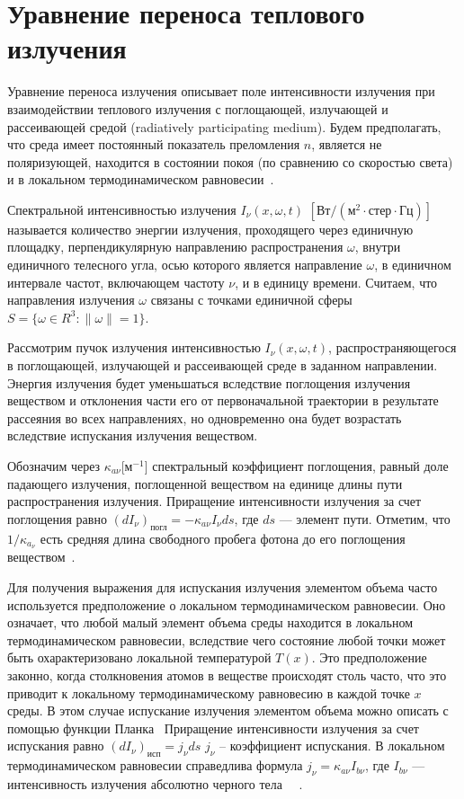 \section{Уравнение переноса теплового излучения}\label{sec:ch1/sec1}
Уравнение переноса излучения описывает поле интенсивности излучения
при взаимодействии теплового излучения с поглощающей,
излучающей и рассеивающей средой
(radiatively participating medium).
Будем предполагать, что среда имеет постоянный показатель
преломления $n$, является не поляризующей,
находится в состоянии покоя (по сравнению со скоростью света) и в локальном
термодинамическом равновесии~\cite[280]{modest2013radiative}.


Спектральной интенсивностью излучения $I_\nu (x, \omega, t)$
$[\text{Вт}/(\text{м}^2 \cdot \text{стер} \cdot \text{Гц})]$
называется количество энергии излучения, проходящего через единичную
площадку, перпендикулярную направлению распространения $\omega$,
внутри единичного телесного угла,
осью которого является направление $\omega$, в единичном
интервале частот, включающем частоту $\nu$, и в единицу времени.
Считаем, что направления излучения $\omega$ связаны с точками единичной
сферы $S = \{\omega \in R^3: \| \omega\| = 1\}$.


Рассмотрим пучок излучения интенсивностью $I_\nu (x, \omega, t)$,
распространяющегося в поглощающей,
излучающей и рассеивающей среде в заданном направлении.
Энергия излучения будет уменьшаться вследствие поглощения
излучения веществом и отклонения части его от первоначальной траектории в
результате рассеяния во всех направлениях, но одновременно она будет возрастать
вследствие испускания излучения веществом.


Обозначим через $\kappa_{a\nu}$[$\text{м}^{-1}$] спектральный коэффициент поглощения,
равный доле падающего излучения, поглощенной веществом на единице длины
пути распространения излучения.
Приращение интенсивности излучения за счет поглощения равно
$(dI_\nu)_\text{погл} = -\kappa_{a\nu} I_\nu ds$, где $ds$ — элемент пути.
Отметим, что $1/\kappa_{a_\nu}$ есть средняя
длина свободного пробега фотона до его поглощения
веществом~\cite[281]{modest2013radiative}.


Для получения выражения для испускания излучения элементом объема
часто используется предположение о локальном термодинамическом равновесии.
Оно означает, что любой малый элемент объема среды находится в
локальном термодинамическом равновесии, вследствие чего состояние любой
точки может быть охарактеризовано локальной температурой $T(x)$.
Это предположение законно, когда столкновения атомов в веществе происходят столь
часто, что это приводит к локальному термодинамическому равновесию в каждой точке $x$ среды.
В этом случае испускание излучения элементом объема
можно описать с помощью функции Планка~\cite[36]{Ozisik1976}
Приращение интенсивности излучения за счет испускания равно
$(dI_\nu)_\text{исп}  = j_\nu ds$  $j_\nu$ -- коэффициент испускания.
В локальном термодинамическом равновесии справедлива формула $j_\nu = \kappa_{a\nu} I_{b\nu}$, где
$I_{b\nu}$ — интенсивность излучения абсолютно черного тела~\cite[36]{Ozisik1976}
~\cite[282]{modest2013radiative}.


